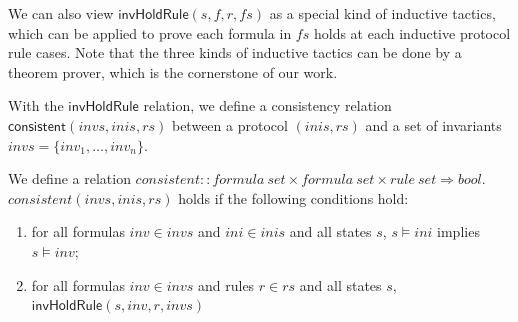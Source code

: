 \documentclass[final]{IEEEtran}
\begin{document}
We can also view $\mathsf{invHoldRule}(s, f, r, fs)$ as a
special kind of inductive tactics, which can be applied to prove
each formula in $fs$ holds at each inductive protocol rule cases. Note that the three kinds of inductive tactics can be done by a theorem prover, which is the cornerstone of our work.

With the $\mathsf{invHoldRule}$ relation, we define a consistency relation $\mathsf{consistent}( invs,inis, rs)$ between a protocol $(inis,rs)$ and a set of invariants $invs=\{inv_1,\ldots, inv_n\}$.

\begin{definition}
We define a relation $consistent::formula~ set \times formula~ set
\times rule ~set \Rightarrow bool$.
 $consistent( invs,inis, rs)$ holds if the following conditions hold:
\begin{enumerate}
\item for all formulas $inv\in invs$ and $ini\in inis$ and all states $s$,
$s \models ini$ implies $s \models inv$;
\item for all formulas $inv\in invs$ and rules  $r \in rs$ and all states $s$,  $\mathsf{invHoldRule}(s, inv, r, invs   )$
\end{enumerate}
\end{definition}




\end{document}
